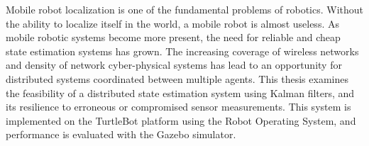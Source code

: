 \documentclass[thesis.tex]{subfile}
\begin{document}
Mobile robot localization is one of the fundamental problems of robotics. Without the ability to localize itself in the world, a mobile robot is almost useless. As mobile robotic systems become more present, the need for reliable and cheap state estimation systems has grown. The increasing coverage of wireless networks and density of network cyber-physical systems has lead to an opportunity for distributed systems coordinated between multiple agents. This thesis examines the feasibility of a distributed state estimation system using Kalman filters, and its resilience to erroneous or compromised sensor measurements. This system is implemented on the TurtleBot platform using the Robot Operating System, and performance is evaluated with the Gazebo simulator.
\end{document}
